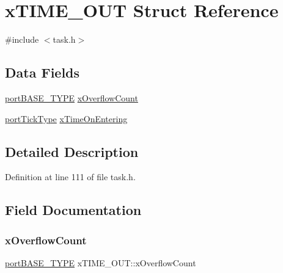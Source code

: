 \hypertarget{structxTIME__OUT}{}\section{x\+T\+I\+M\+E\+\_\+\+O\+UT Struct Reference}
\label{structxTIME__OUT}


{\ttfamily \#include $<$task.\+h$>$}

\subsection*{Data Fields}
\begin{DoxyCompactItemize}
\item 
\hyperlink{portmacro_8h_a1ebe82d24d764ae4e352f7c3a9f92c01}{port\+B\+A\+S\+E\+\_\+\+T\+Y\+PE} \hyperlink{structxTIME__OUT_ac04daff481f3ee5f08228b09a83a678b}{x\+Overflow\+Count}
\item 
\hyperlink{portmacro_8h_a4d746b2ff8fafc490b764c66411ec457}{port\+Tick\+Type} \hyperlink{structxTIME__OUT_a8342bf2057b33c50205da6a19d9caa1c}{x\+Time\+On\+Entering}
\end{DoxyCompactItemize}


\subsection{Detailed Description}


Definition at line 111 of file task.\+h.



\subsection{Field Documentation}
\mbox{\label{structxTIME__OUT_ac04daff481f3ee5f08228b09a83a678b}} 
\subsubsection{\texorpdfstring{x\+Overflow\+Count}{xOverflowCount}}
{\footnotesize\ttfamily \hyperlink{portmacro_8h_a1ebe82d24d764ae4e352f7c3a9f92c01}{port\+B\+A\+S\+E\+\_\+\+T\+Y\+PE} x\+T\+I\+M\+E\+\_\+\+O\+U\+T\+::x\+Overflow\+Count}



